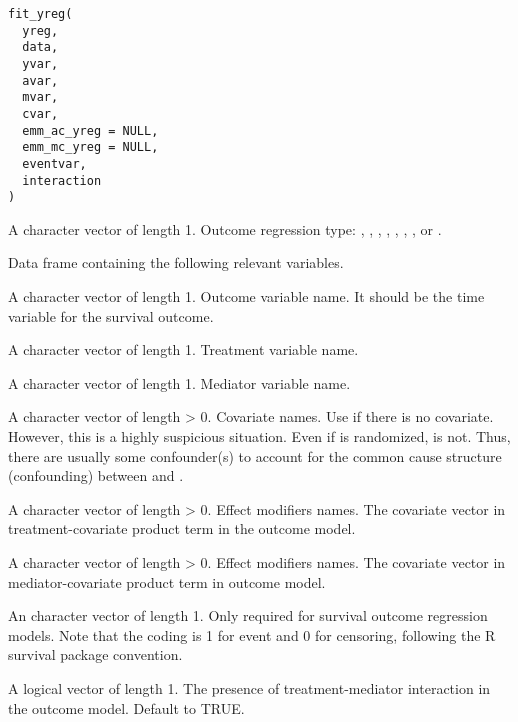 \documentclass[a4paper]{book}
\begin{document}
%
\begin{Usage}
\begin{verbatim}
fit_yreg(
  yreg,
  data,
  yvar,
  avar,
  mvar,
  cvar,
  emm_ac_yreg = NULL,
  emm_mc_yreg = NULL,
  eventvar,
  interaction
)
\end{verbatim}
\end{Usage}
%
\begin{Arguments}
\begin{ldescription}
\item[\code{yreg}] A character vector of length 1. Outcome regression type: , , , , , , , or .

\item[\code{data}] Data frame containing the following relevant variables.

\item[\code{yvar}] A character vector of length 1. Outcome variable name. It should be the time variable for the survival outcome.

\item[\code{avar}] A character vector of length 1. Treatment variable name.

\item[\code{mvar}] A character vector of length 1. Mediator variable name.

\item[\code{cvar}] A character vector of length > 0. Covariate names. Use  if there is no covariate. However, this is a highly suspicious situation. Even if  is randomized,  is not. Thus, there are usually some confounder(s) to account for the common cause structure (confounding) between  and .

\item[\code{emm\_ac\_yreg}] A character vector of length > 0. Effect modifiers names. The covariate vector in treatment-covariate product term in the outcome model.

\item[\code{emm\_mc\_yreg}] A character vector of length > 0. Effect modifiers names. The covariate vector in mediator-covariate product term in outcome model.

\item[\code{eventvar}] An character vector of length 1. Only required for survival outcome regression models. Note that the coding is 1 for event and 0 for censoring, following the R survival package convention.

\item[\code{interaction}] A logical vector of length 1. The presence of treatment-mediator interaction in the outcome model. Default to TRUE.
\end{ldescription}
\end{Arguments}
\end{document}
